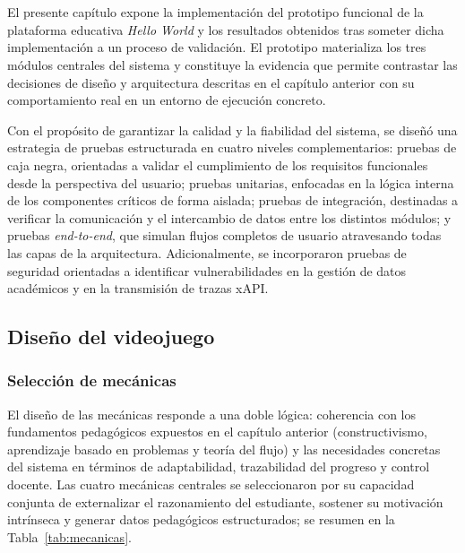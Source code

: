 \chapter{\chapterThree}

El presente capítulo expone la implementación del prototipo funcional de la plataforma educativa \textit{Hello World} y los resultados obtenidos tras someter dicha implementación a un proceso de validación. El prototipo materializa los tres módulos centrales del sistema y constituye la evidencia que permite contrastar las decisiones de diseño y arquitectura descritas en el capítulo anterior con su comportamiento real en un entorno de ejecución concreto.

Con el propósito de garantizar la calidad y la fiabilidad del sistema, se diseñó una estrategia de pruebas estructurada en cuatro niveles complementarios: pruebas de caja negra, orientadas a validar el cumplimiento de los requisitos funcionales desde la perspectiva del usuario; pruebas unitarias, enfocadas en la lógica interna de los componentes críticos de forma aislada; pruebas de integración, destinadas a verificar la comunicación y el intercambio de datos entre los distintos módulos; y pruebas \textit{end-to-end}, que simulan flujos completos de usuario atravesando todas las capas de la arquitectura. Adicionalmente, se incorporaron pruebas de seguridad orientadas a identificar vulnerabilidades en la gestión de datos académicos y en la transmisión de trazas xAPI.

\section{Diseño del videojuego}

\subsection{Selección de mecánicas}

El diseño de las mecánicas responde a una doble lógica: coherencia con los fundamentos pedagógicos expuestos en el capítulo anterior (constructivismo, aprendizaje basado en problemas y teoría del flujo) y las necesidades concretas del sistema en términos de adaptabilidad, trazabilidad del progreso y control docente. Las cuatro mecánicas centrales se seleccionaron por su capacidad conjunta de externalizar el razonamiento del estudiante, sostener su motivación intrínseca y generar datos pedagógicos estructurados; se resumen en la Tabla~\ref{tab:mecanicas}.


